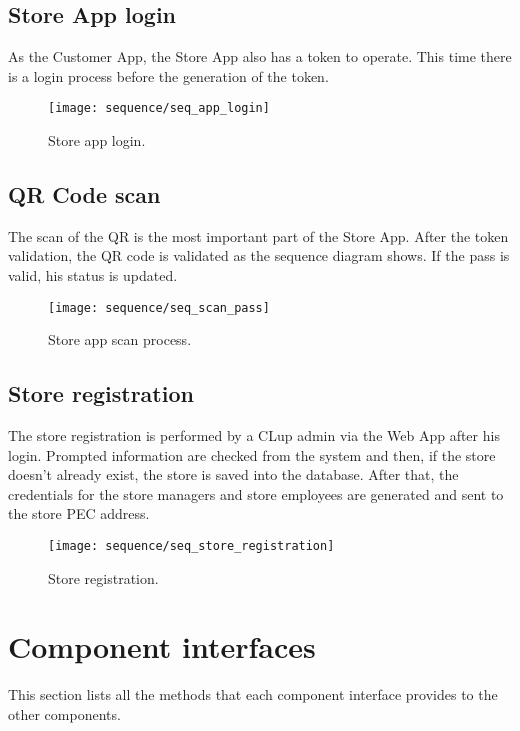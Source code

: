 \subsection{Store App login}
As the Customer App, the Store App also has a token to operate. This time there is a login process before the generation of the token.
\begin{figure}[H]
	\centering
	\texttt{[image: sequence/seq\_app\_login]}
	\caption{Store app login.}
	\label{fig:seq_app_login}
\end{figure}

\subsection{QR Code scan}
The scan of the QR is the most important part of the Store App. After the token validation, the QR code is validated as the sequence diagram shows. If the pass is valid, his status is updated.
\begin{figure}[H]
	\centering
	\texttt{[image: sequence/seq\_scan\_pass]}
	\caption{Store app scan process.}
	\label{fig:seq_scan_pass}
\end{figure}

\subsection{Store registration}
The store registration is performed by a CLup admin via the Web App after his login. Prompted information are checked from the system and then, if the store doesn't already exist, the store is saved into the database. After that, the credentials for the store managers and store employees are generated and sent to the store PEC address.
\begin{figure}[H]
	\centering
	\texttt{[image: sequence/seq\_store\_registration]}
	\caption{Store registration.}
	\label{fig:seq_store_registration}
\end{figure}

\clearpage

\section{Component interfaces}
This section lists all the methods that each component interface provides to the other components.

